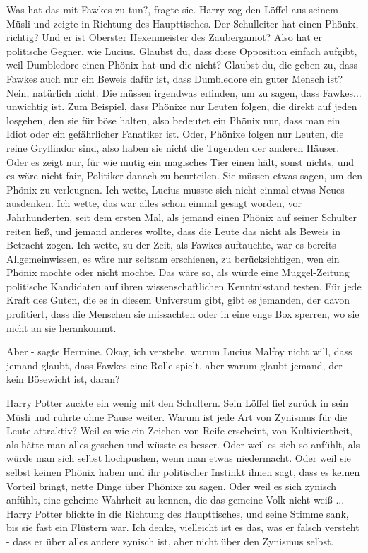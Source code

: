 \glqq{}Was hat das mit Fawkes zu tun?\grqq{}, fragte sie. Harry zog den Löffel
aus seinem Müsli und zeigte in Richtung des Haupttisches. \glqq{}Der Schulleiter
hat einen Phönix, richtig? Und er ist Oberster Hexenmeister des Zaubergamot?
Also hat er politische Gegner, wie Lucius. Glaubst du, dass diese Opposition
einfach aufgibt, weil Dumbledore einen Phönix hat und die nicht? Glaubst du, die
geben zu, dass Fawkes auch nur ein Beweis dafür ist, dass Dumbledore ein guter
Mensch ist? Nein, natürlich nicht. Die müssen irgendwas erfinden, um zu sagen,
dass Fawkes... unwichtig ist. Zum Beispiel, dass Phönixe nur Leuten folgen, die
direkt auf jeden losgehen, den sie für böse halten, also bedeutet ein Phönix
nur, dass man ein Idiot oder ein gefährlicher Fanatiker ist. Oder, Phönixe
folgen nur Leuten, die reine Gryffindor sind, also haben sie nicht die Tugenden
der anderen Häuser. Oder es zeigt nur, für wie mutig ein magisches Tier einen
hält, sonst nichts, und es wäre nicht fair, Politiker danach zu beurteilen. Sie
müssen etwas sagen, um den Phönix zu verleugnen. Ich wette, Lucius musste sich
nicht einmal etwas Neues ausdenken. Ich wette, das war alles schon einmal gesagt
worden, vor Jahrhunderten, seit dem ersten Mal, als jemand einen Phönix auf
seiner Schulter reiten ließ, und jemand anderes wollte, dass die Leute das nicht
als Beweis in Betracht zogen. Ich wette, zu der Zeit, als Fawkes auftauchte, war
es bereits Allgemeinwissen, es wäre nur seltsam erschienen, zu berücksichtigen,
wen ein Phönix mochte oder nicht mochte. Das wäre so, als würde eine
Muggel-Zeitung politische Kandidaten auf ihren wissenschaftlichen Kenntnisstand
testen. Für jede Kraft des Guten, die es in diesem Universum gibt, gibt es
jemanden, der davon profitiert, dass die Menschen sie missachten oder in eine
enge Box sperren, wo sie nicht an sie herankommt.\grqq{}

\glqq{}Aber -\grqq{} sagte Hermine. \glqq{}Okay, ich verstehe, warum Lucius Malfoy
nicht will, dass jemand glaubt, dass Fawkes eine Rolle spielt, aber warum glaubt
jemand, der kein Bösewicht ist, daran?\grqq{}

Harry Potter zuckte ein wenig mit den Schultern. Sein Löffel fiel zurück in sein
Müsli und rührte ohne Pause weiter. \glqq{}Warum ist jede Art von Zynismus für
die Leute attraktiv? Weil es wie ein Zeichen von Reife erscheint, von
Kultiviertheit, als hätte man alles gesehen und wüsste es besser. Oder weil es
sich so anfühlt, als würde man sich selbst hochpushen, wenn man etwas
niedermacht. Oder weil sie selbst keinen Phönix haben und ihr politischer
Instinkt ihnen sagt, dass es keinen Vorteil bringt, nette Dinge über Phönixe zu
sagen. Oder weil es sich zynisch anfühlt, eine geheime Wahrheit zu kennen, die
das gemeine Volk nicht weiß ...\grqq{} Harry Potter blickte in die Richtung des
Haupttisches, und seine Stimme sank, bis sie fast ein Flüstern war. \glqq{}Ich
denke, vielleicht ist es das, was er falsch versteht - dass er über alles andere
zynisch ist, aber nicht über den Zynismus selbst.\grqq{}

